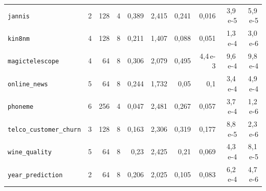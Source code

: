 \begin{table}[htbp]
\begin{tabular}{lrrrrrrrrr}
\texttt{jannis} & 2 & 128 & 4 & 0{,}389 & 2{,}415 & 0{,}241 & 0{,}016 & 3{,}9\,e-5 & 5{,}9\,e-5 \\
\texttt{kin8nm} & 4 & 128 & 8 & 0{,}211 & 1{,}407 & 0{,}088 & 0{,}051 & 1{,}3\,e-4 & 3{,}0\,e-6 \\
\texttt{magictelescope} & 4 & 64 & 8 & 0{,}306 & 2{,}079 & 0{,}495 & 4{,}4\,e-3 & 9{,}6\,e-4 & 9{,}8\,e-4 \\
\texttt{online\_news} & 5 & 64 & 8 & 0{,}244 & 1{,}732 & 0{,}05 & 0{,}1 & 3{,}4\,e-4 & 4{,}9\,e-4 \\
\texttt{phoneme} & 6 & 256 & 4 & 0{,}047 & 2{,}481 & 0{,}267 & 0{,}057 & 3{,}7\,e-4 & 1{,}2\,e-6 \\
\texttt{telco\_\allowbreak customer\_\allowbreak churn} & 3 & 128 & 8 & 0{,}163 & 2{,}306 & 0{,}319 & 0{,}177 & 8{,}8\,e-5 & 2{,}3\,e-6 \\
\texttt{wine\_quality} & 5 & 64 & 8 & 0{,}23 & 2{,}425 & 0{,}21 & 0{,}069 & 4{,}3\,e-4 & 8{,}1\,e-5 \\
\texttt{year\_\allowbreak prediction} & 2 & 64 & 8 & 0{,}206 & 2{,}025 & 0{,}105 & 0{,}083 & 6{,}2\,e-4 & 4{,}7\,e-6 \\
\bottomrule
\end{tabular}
\end{table}

